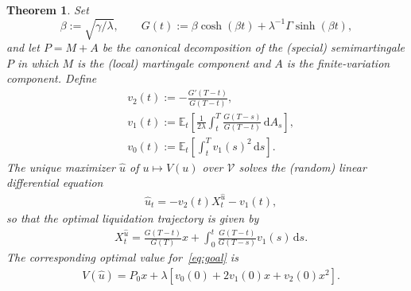 \documentclass[11pt]{article}
\newtheorem{thm}{Theorem}[section]
\theoremstyle{definition}
\theoremstyle{remark}
\newtheorem{rem}[thm]{Remark}
\newcommand{\E}{\mathbb{E}} %
\DeclarePairedDelimiter{\abs}{\lvert}{\rvert} %
\newcommand{\ts}{\textstyle}
\newcommand{\closeEqn}{\tag*{$\diamond$}}
\newcommand{\de}{\,\mathrm{d}}
\begin{document}
\begin{thm}\label{main}
Set 
$$\beta:=\sqrt{\gamma/\lambda}, \qquad G(t):= \beta\cosh(\beta t)+\lambda^{-1}\Gamma\sinh(\beta t),
$$
and let $P=M+A$ be the canonical decomposition of the (special) semimartingale $P$ in which $M$ is the (local) martingale component and $A$ is the finite-variation component. Define 
\begin{align*}
& v_2(t):= %
-\frac{G'(T-t)}{G(T-t)},\\%
& v_1(t):= \E_t\left[ \frac{1}{2\lambda}\int_t^T \frac{G(T-s)}{G(T-t)} \de A_s \right],\\ %
& v_0(t):= \E_t\left[ \int_t^T v_1(s)^2 \de s \right].
\end{align*}
The unique maximizer $\hat{u}$ of $u\mapsto V(u)$ over $\mathcal V$ solves the (random) linear differential equation
\begin{align}\label{eq:ODE}
&\hat{u}_t = -v_2(t) X^{\hat{u}}_t - v_1(t),
\end{align}
so that the optimal liquidation trajectory is given by
\begin{align}\label{eq:Pos}
&X^{\hat{u}}_t = \frac{G(T-t)}{G(T)}x + \int_0^t \frac{G(T-t)}{G(T-s)} v_1(s) \de s.
\end{align}
The corresponding optimal value for~\eqref{eq:goal} is
\begin{align}
&\ts V(\hat{u}) = P_0 x + \lambda\left[v_0(0) + 2 v_1(0) x + v_2(0) x^2\right].\closeEqn
\end{align}
\end{thm}

\end{document}
